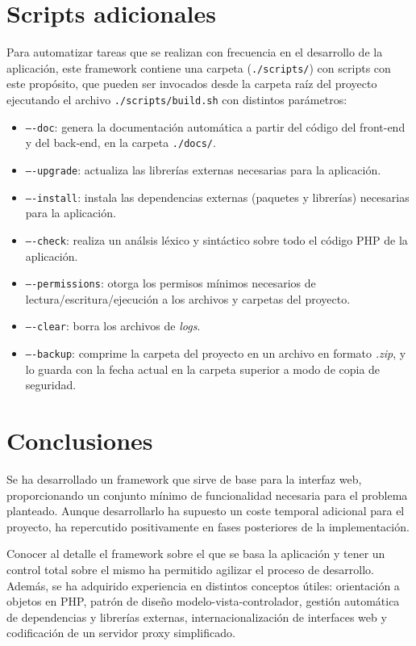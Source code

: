 \section{Scripts adicionales\label{extra:mvc:scripts}}

Para automatizar tareas que se realizan con frecuencia en el desarrollo de la aplicación, este \gls{framework} contiene una carpeta (\texttt{./scripts/}) con \glspl{script} con este propósito, que pueden ser invocados desde la carpeta raíz del proyecto ejecutando el archivo \texttt{./scripts/build.sh} con distintos parámetros:
\begin{itemize}
  \item \texttt{----doc}: genera la documentación automática a partir del código del \gls{front-end} y del \gls{back-end}, en la carpeta \texttt{./docs/}.
  \item \texttt{----upgrade}: actualiza las librerías externas necesarias para la aplicación.
  \item \texttt{----install}: instala las dependencias externas (paquetes y librerías) necesarias para la aplicación.
  \item \texttt{----check}: realiza un análsis léxico y sintáctico sobre todo el código \gls{PHP} de la aplicación. 
  \item \texttt{----permissions}: otorga los permisos mínimos necesarios de lectura/escritura/ejecución a los archivos y carpetas del proyecto.
  \item \texttt{----clear}: borra los archivos de \textit{logs}.
  \item \texttt{----backup}: comprime la carpeta del proyecto en un archivo en formato \textit{.zip}, y lo guarda con la fecha actual en la carpeta superior a modo de copia de seguridad.
\end{itemize}

\section{Conclusiones\label{extra:mvc:conclusiones}}

Se ha desarrollado un \gls{framework} que sirve de base para la interfaz web, proporcionando un conjunto mínimo de funcionalidad necesaria para el problema planteado.
Aunque desarrollarlo ha supuesto un coste temporal adicional para el proyecto, ha repercutido positivamente en fases posteriores de la implementación.

Conocer al detalle el \gls{framework} sobre el que se basa la aplicación y tener un control total sobre el mismo ha permitido agilizar el proceso de desarrollo.
Además, se ha adquirido experiencia en distintos conceptos útiles: orientación a objetos en \gls{PHP}, patrón de diseño modelo-vista-controlador, gestión automática de dependencias y librerías externas, internacionalización de interfaces web y codificación de un servidor \gls{proxy} simplificado.